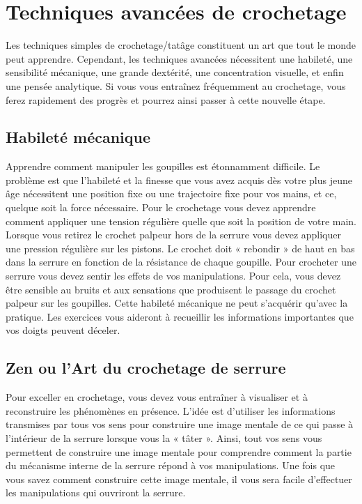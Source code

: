 \documentclass[a4paper,french,11pt,twoside]{report}
\begin{document}
\chapter{\label{chap:techniques_avancees}Techniques avancées de crochetage}

Les techniques simples de crochetage/tatâge constituent un art que tout le monde peut apprendre. Cependant, les techniques avancées nécessitent une habileté, une sensibilité mécanique, une grande dextérité, une concentration visuelle, et enfin une pensée analytique. Si vous vous entraînez fréquemment au crochetage, vous ferez rapidement des progrès et pourrez ainsi passer à cette nouvelle étape.

\section{Habileté mécanique}

Apprendre comment manipuler les goupilles est étonnamment difficile. Le problème est que l'habileté et la finesse que vous avez acquis dès votre plus jeune âge nécessitent une position fixe ou une trajectoire fixe pour vos mains, et ce, quelque soit la force nécessaire. Pour le crochetage vous devez apprendre comment appliquer une tension régulière quelle que soit la position de votre main. Lorsque vous retirez le crochet palpeur hors de la serrure vous devez appliquer une pression régulière sur les pistons. Le crochet doit « rebondir » de haut en bas dans la serrure en fonction de la résistance de chaque goupille.
Pour crocheter une serrure vous devez sentir les effets de vos manipulations. Pour cela, vous devez être sensible au bruits et aux sensations que produisent le passage du crochet palpeur sur les goupilles. Cette habileté mécanique ne peut s'acquérir qu'avec la pratique. Les exercices vous aideront à recueillir les informations importantes que vos doigts peuvent déceler.

\section{Zen ou l'Art du crochetage de serrure}

Pour exceller en crochetage, vous devez vous entraîner à visualiser et à reconstruire les phénomènes en présence. L'idée est d'utiliser les informations transmises par tous vos sens pour construire une image mentale de ce qui passe à l'intérieur de la serrure lorsque vous la « tâter ». Ainsi, tout vos sens vous permettent de construire une image mentale pour comprendre comment la partie du mécanisme interne de la serrure répond à vos manipulations. Une fois que vous savez comment construire cette image mentale, il vous sera facile d'effectuer les manipulations qui ouvriront la serrure.
\end{document}
